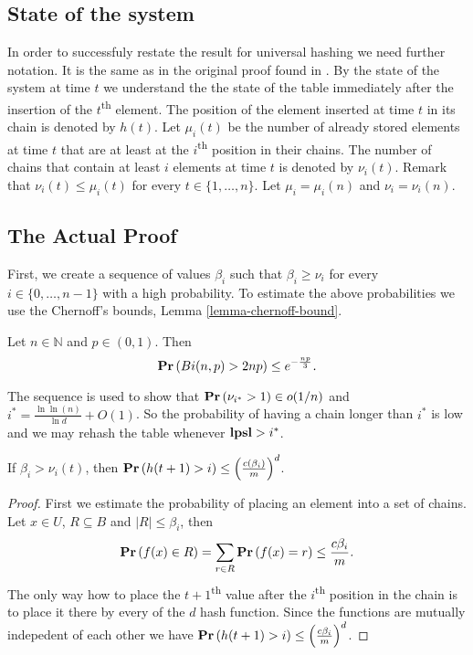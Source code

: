 \subsection{State of the system}
In order to successfuly restate the result for universal hashing we need further notation. It is the same as in the original proof found in \cite{1076315}. 
By the state of the system at time $t$ we understand the the state of the table immediately after the insertion of the $t$\textsuperscript{th} element.
The position of the element inserted at time $t$ in its chain is denoted by $h(t)$. Let $\mu_i(t)$ be the number of already stored elements at time $t$ that are at least at the $i$\textsuperscript{th} position in their chains. The number of chains that contain at least $i$ elements at time $t$ is denoted by $\nu_i(t)$. Remark that $\nu_i(t) \leq \mu_i(t)$ for every $t \in \{1, \dots, n \}$. Let $\mu_i = \mu_i(n)$ and $\nu_i = \nu_i(n)$.

\subsection{The Actual Proof}
First, we create a sequence of values $\beta_i$ such that $\beta_i \geq \nu_i$ for every $i \in \{0, \dots, n - 1\}$ with a high probability. To estimate the above probabilities we use the Chernoff's bounds, Lemma \ref{lemma-chernoff-bound}.

\begin{lemma}
\label{lemma-chernoff-bound}
Let $n \in \mathbb{N}$ and $p \in (0, 1)$. Then $$\mathbf{Pr}\left(Bi(n, p) > 2np\right) \leq e ^ {- \frac{np}{3}} \textit{.}$$
\end{lemma}

The sequence is used to show that $\mathbf{Pr}\left(\nu_{i^{*}} > 1\right) \in o(1/n)$ and $i^* = \frac{\ln \ln (n)}{\ln d} + O(1)$. So the probability of having a chain longer than $i^*$ is low and we may rehash the table whenever $\mathbf{lpsl} > i^*$.

\begin{lemma}
\label{lemma-height-of-inserted-ball}
If $\beta_i > \nu_i(t)$, then $\mathbf{Pr}\left(h(t + 1) > i\right) \leq \left(\frac{c(\beta_i)}{m}\right) ^ d$.
\end{lemma}
\begin{proof}
First we estimate the probability of placing an element into a set of chains. Let $x \in U$, $R \subseteq B$ and $|R| \leq \beta_i$, then $$\mathbf{Pr}\left(f(x) \in R\right) = \displaystyle\sum_{r \in R} \mathbf{Pr}\left(f(x) = r\right) \leq \frac{c\beta_i}{m} \textit{.}$$
The only way how to place the $t + 1$\textsuperscript{th} value after the $i$\textsuperscript{th} position in the chain is to place it there by every of the $d$ hash function. Since the functions are mutually indepedent of each other we have $\mathbf{Pr}\left(h(t + 1) > i\right) \leq \left(\frac{c \beta_i}{m}\right) ^ d$.
\end{proof}

